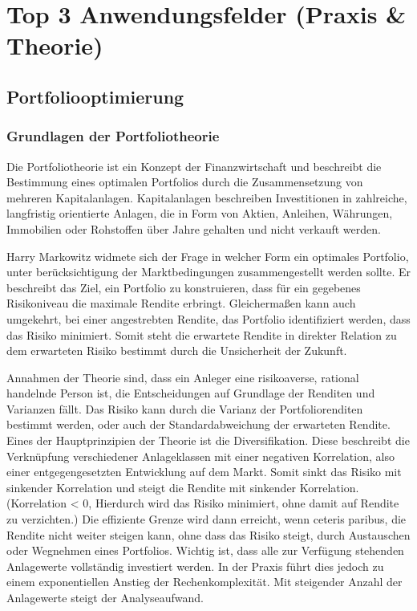 \section{Top 3 Anwendungsfelder (Praxis \& Theorie)}

\subsection{Portfoliooptimierung}

\subsubsection*{Grundlagen der Portfoliotheorie}

Die Portfoliotheorie ist ein Konzept der Finanzwirtschaft und beschreibt die Bestimmung eines optimalen Portfolios durch die Zusammensetzung von mehreren Kapitalanlagen. Kapitalanlagen beschreiben Investitionen in zahlreiche, langfristig orientierte Anlagen, die in Form von Aktien, Anleihen, Währungen, Immobilien oder Rohstoffen über Jahre gehalten und nicht verkauft werden. 

 
Harry Markowitz widmete sich der Frage in welcher Form ein optimales Portfolio, unter berücksichtigung der Marktbedingungen zusammengestellt werden sollte. Er beschreibt das Ziel, ein Portfolio zu konstruieren, dass für ein gegebenes Risikoniveau die maximale Rendite erbringt. Gleichermaßen kann auch umgekehrt, bei einer angestrebten Rendite, das Portfolio identifiziert werden, dass das Risiko minimiert. Somit steht die erwartete Rendite in direkter Relation zu dem erwarteten Risiko bestimmt durch die Unsicherheit der Zukunft.

 
Annahmen der Theorie sind, dass ein Anleger eine risikoaverse, rational handelnde Person ist, die Entscheidungen auf Grundlage der Renditen und Varianzen fällt. Das Risiko kann durch die Varianz der Portfoliorenditen bestimmt werden, oder auch der Standardabweichung der erwarteten Rendite. 
Eines der Hauptprinzipien der Theorie ist die Diversifikation. Diese beschreibt die Verknüpfung verschiedener Anlageklassen mit einer negativen Korrelation, also einer entgegengesetzten Entwicklung auf dem Markt. Somit sinkt das Risiko mit sinkender Korrelation und steigt die Rendite mit sinkender Korrelation. (Korrelation < 0, Hierdurch wird das Risiko minimiert, ohne damit auf Rendite zu verzichten.)
Die effiziente Grenze wird dann erreicht, wenn ceteris paribus, die Rendite nicht weiter steigen kann, ohne dass das Risiko steigt, durch Austauschen oder Wegnehmen eines Portfolios. 
Wichtig ist, dass alle zur Verfügung stehenden Anlagewerte vollständig investiert werden. In der Praxis führt dies jedoch zu einem exponentiellen Anstieg der Rechenkomplexität. Mit steigender Anzahl der Anlagewerte steigt der Analyseaufwand. 

